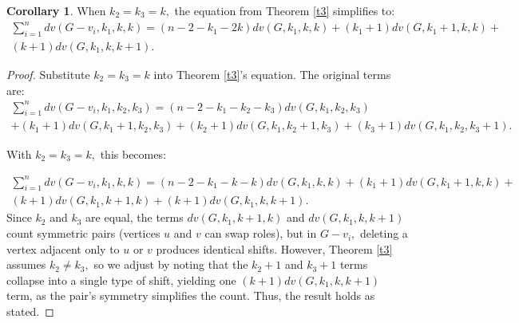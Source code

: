 \documentclass[11pt,oneside]{article}
\theoremstyle{definition}
\newtheorem{coro}[thm]{Corollary}
\begin{document}
\begin{coro}\label{c1}
When $k_2=k_3=k,$ the equation from Theorem \ref{t3} simplifies to: 
\begin{multline} 
\sum_{i=1}^{n}{dv(G-v_i,k_1,k,k)}=(n-2-k_1-2k)dv(G,k_1,k,k)+(k_1+1)dv(G,k_1+1,k,k)
+\\(k+1)dv(G,k_1,k,k+1). 
\end{multline}
\end{coro}
\begin{proof}
Substitute $k_2=k_3=k$ into Theorem \ref{t3}'s equation. The original terms are:
\begin{multline} \sum_{i=1}^{n}{dv(G-v_i,k_1,k_2,k_3)}=(n-2-k_1-k_2-k_3)dv(G,k_1,k_2,k_3)\\+(k_1+1)dv(G,k_1+1,k_2,k_3)
+(k_2+1)dv(G,k_1,k_2+1,k_3)+(k_3+1)dv(G,k_1,k_2,k_3+1). 
\end{multline}

With $k_2=k_3=k,$ this becomes:

\begin{multline} 
\sum_{i=1}^{n}{dv(G-v_i,k_1,k,k)}=(n-2-k_1-k-k)dv(G,k_1,k,k)+(k_1+1)dv(G,k_1+1,k,k)+\\(k+1)dv(G,k_1,k+1,k) +(k+1)dv(G,k_1,k,k+1). 
\end{multline}
Since $k_2$ and $k_3$ are equal, the terms $dv(G,k_1,k+1,k)$ and $dv(G,k_1,k,k+1)$ count symmetric pairs (vertices $u$ and $v$ can swap roles), but in $G-v_i,$ deleting a vertex adjacent only to $u$ or $v$ produces identical shifts. However, Theorem \ref{t3} assumes $k_2 \neq k_3,$ so we adjust by noting that the $k_2+1$ and  $k_3+1$ terms collapse into a single type of shift, yielding one $(k+1)dv(G,k_1,k,k+1)$ term, as the pair's symmetry simplifies the count. Thus, the result holds as stated.



\end{proof}  
\end{document}
